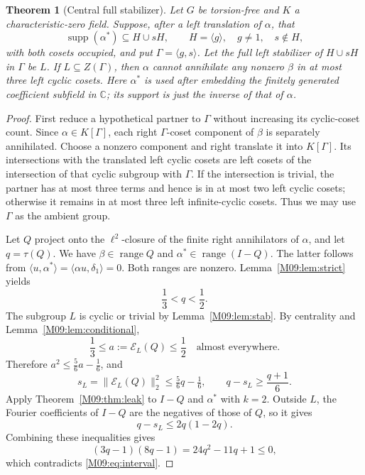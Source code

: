 \documentclass[11pt,a4paper,oneside]{report}
\newtheorem{theorem}{Theorem}[section]
\theoremstyle{definition}
\theoremstyle{remark}
\DeclareMathOperator{\supp}{supp}
\newcommand{\C}{\mathbb C}
\begin{document}
\begin{theorem}[Central full stabilizer]\label{M09:thm:central}
Let $G$ be torsion-free and $K$ a characteristic-zero field.
Suppose, after a left translation of $\alpha$, that
\[
\supp(\alpha^*)\subseteq H\cup sH,\qquad
H=\langle g\rangle,\quad g\ne1,\quad s\notin H,
\]
with both cosets occupied, and put $\Gamma=\langle g,s\rangle$.
Let the full left stabilizer of $H\cup sH$ in $\Gamma$ be
$L$. If $L\subseteq Z(\Gamma)$, then $\alpha$ cannot annihilate
any nonzero $\beta$ in at most three left cyclic cosets.
Here $\alpha^*$ is used after embedding the finitely generated coefficient
subfield in $\C$; its support is just the inverse of that of $\alpha$.
\end{theorem}
\begin{proof}
First reduce a hypothetical partner to $\Gamma$ without increasing
its cyclic-coset count. Since $\alpha\in K[\Gamma]$, each right
$\Gamma$-coset component of $\beta$ is separately annihilated.
Choose a nonzero component and right translate it into $K[\Gamma]$.
Its intersections with the translated left cyclic cosets are left
cosets of the intersection of that cyclic subgroup with $\Gamma$.
If the intersection is trivial, the partner has at most three
terms and hence is in at most two left cyclic cosets; otherwise
it remains in at most three left infinite-cyclic cosets.
Thus we may use $\Gamma$ as the ambient group.

Let $Q$ project onto the $\ell^2$-closure of the finite right
annihilators of $\alpha$, and let $q=\tau(Q)$. We have
$\beta\in\operatorname{range}Q$ and
$\alpha^*\in\operatorname{range}(I-Q)$. The latter follows from
$\langle u,\alpha^*\rangle=\langle\alpha u,\delta_1\rangle=0$.
Both ranges are nonzero. Lemma~\ref{M09:lem:strict} yields
\begin{equation}\label{M09:eq:interval}
\frac13<q<\frac12.
\end{equation}
The subgroup $L$ is cyclic or trivial by Lemma~\ref{M09:lem:stab}.
By centrality and Lemma~\ref{M09:lem:conditional},
\[
\frac13\le a:=\mathcal E_L(Q)\le\frac12
\quad\text{almost everywhere}.
\]
Therefore $a^2\le\tfrac56a-\tfrac16$, and
\[
s_L=\|\mathcal E_L(Q)\|_2^2\le\tfrac56q-\tfrac16,
\qquad q-s_L\ge\frac{q+1}{6}.
\]
Apply Theorem~\ref{M09:thm:leak} to $I-Q$ and $\alpha^*$ with $k=2$.
Outside $L$, the Fourier coefficients of $I-Q$ are the negatives
of those of $Q$, so it gives
\[
q-s_L\le2q(1-2q).
\]
Combining these inequalities gives
\[
(3q-1)(8q-1)=24q^2-11q+1\le0,
\]
which contradicts \eqref{M09:eq:interval}.
\end{proof}
\end{document}
